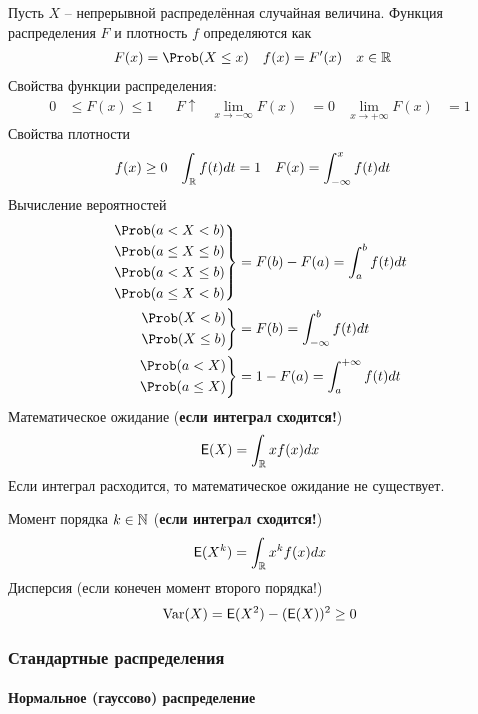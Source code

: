Пусть \(X\) -- непрерывной распределённая случайная величина. Функция распределения \(F\) и плотность \(f\)
определяются как
\begin{align*}
	F(x)&=\Prob(X\leq x) & f(x)&=F'(x) & x&\in\R
\end{align*}
Свойства функции распределения:
\begin{align*}
	0&\leq F(x)\leq1 & &F \uparrow & 
	\lim_{x\to-\infty}F(x)&=0 & \lim_{x\to+\infty}F(x)&=1
\end{align*}
Свойства плотности
\begin{align*}
	f(x)&\geq 0 & \int_{\mathbb R} f(t)dt&=1 & F(x)&=\int_{-\infty}^x f(t)dt
\end{align*}
Вычисление вероятностей
\begin{align*}
	\left.\begin{aligned}
	&\Prob(a<X<b) \\ & \Prob(a\leq X\leq b) \\ 
	& \Prob(a<X\leq b) \\ &\Prob(a\leq X< b)
	\end{aligned}
	\right\}&=F(b)-F(a)=\int_a^b f(t)dt\\
	\left.\begin{aligned}
	&\Prob(X<b) \\ & \Prob(X\leq b)
	\end{aligned}
	\right\}&=F(b)=\int_{-\infty}^b f(t)dt\\
	\left.\begin{aligned}
	&\Prob(a<X) \\ & \Prob(a\leq X)
	\end{aligned}
	\right\}&=1-F(a)=\int_{a}^{+\infty} f(t)dt
\end{align*}
Математическое ожидание (\textbf{если интеграл сходится!})
\[
	{\mathsf E}(X)=\int_{\mathbb R} xf(x)dx
\]
Если интеграл расходится, то математическое ожидание не существует.

Момент порядка \(k\in\mathbb N\)  (\textbf{если интеграл сходится!})
\[
	{\mathsf E}(X^k)=\int_{\mathbb R} x^kf(x)dx
\]
Дисперсия (если конечен момент второго порядка!)
\[
	\operatorname{Var}(X)={\mathsf E}(X^2)-({\mathsf E}(X))^2\geq0
\]

\subsubsection{Стандартные распределения}

\paragraph{Нормальное (гауссово) распределение}

